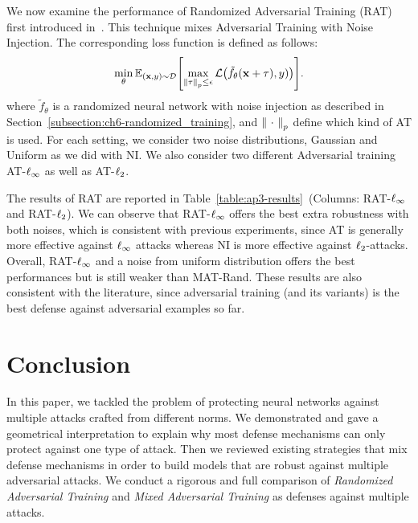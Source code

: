 We now examine the performance of Randomized Adversarial Training (RAT) first introduced in~\cite{salman2019provably}.
This technique mixes Adversarial Training with Noise Injection.
The corresponding loss function is defined as follows:
\begin{equation}
  \min_{\theta} \Ebb_{(\xvec, y) \sim \mathcal{D}} \left[ \max_{\norm{\tau}_p \leq \epsilon} \mathcal{L} \left( \tilde{f}_{\theta}(\xvec+\tau), y)  \right) \right].
\end{equation}
where $\tilde{f}_\theta$ is a randomized neural network with noise injection as described in Section~\ref{subsection:ch6-randomized_training}, and $\norm{\ \cdot\ }_p$ define which kind of AT is used.
For each setting, we consider two noise distributions, Gaussian and Uniform as we did with NI.
We also consider two different Adversarial training AT-$\ell_\infty $ as well as AT-$\ell_2 $. 

The results of RAT are reported in Table~\ref{table:ap3-results}~(Columns: RAT-$\ell_\infty $ and RAT-$\ell_2 $).
We can observe that RAT-$\ell_\infty $ offers the best extra robustness with both noises, which is consistent with previous experiments, since AT is generally more effective against $\ell_\infty $ attacks whereas NI is more effective against $\ell_2 $-attacks.
Overall, RAT-$\ell_\infty $ and a noise from uniform distribution offers the best performances but is still weaker than MAT-Rand.
These results are also consistent with the literature, since adversarial training (and its variants) is the best defense against adversarial examples so far.


\section{Conclusion}
\label{section:ap3-conclusion}

In this paper, we tackled the problem of protecting neural networks against multiple attacks crafted from different norms.
We demonstrated and gave a geometrical interpretation to explain why most defense mechanisms can only protect against one type of attack.
Then we reviewed existing strategies that mix defense mechanisms in order to build models that are robust against multiple adversarial attacks.
We conduct a rigorous and full comparison of \emph{Randomized Adversarial Training} and \emph{Mixed Adversarial Training} as defenses against multiple attacks.

